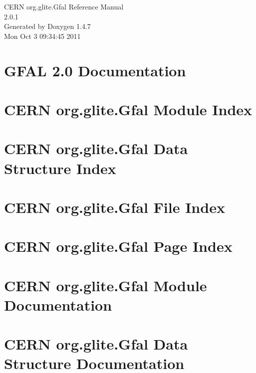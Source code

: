 \documentclass[a4paper]{book}
\begin{document}
\begin{titlepage}
\vspace*{7cm}
\begin{center}
{\Large CERN org.glite.Gfal Reference Manual\\[1ex]\large 2.0.1 }\\
\vspace*{1cm}
{\large Generated by Doxygen 1.4.7}\\
\vspace*{0.5cm}
{\small Mon Oct 3 09:34:45 2011}\\
\end{center}
\end{titlepage}
\clearemptydoublepage
{}
\tableofcontents
\clearemptydoublepage
{}
\chapter{GFAL 2.0 Documentation }
\label{index}
\chapter{CERN org.glite.Gfal Module Index}

\chapter{CERN org.glite.Gfal Data Structure Index}

\chapter{CERN org.glite.Gfal File Index}

\chapter{CERN org.glite.Gfal Page Index}

\chapter{CERN org.glite.Gfal Module Documentation}

\chapter{CERN org.glite.Gfal Data Structure Documentation}







\end{document}
